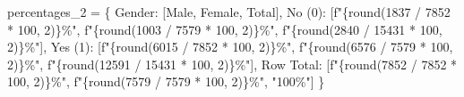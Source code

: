 \documentclass[
  letterpaper,
  DIV=11,
  numbers=noendperiod]{scrreprt}
\newenvironment{Shaded}{\begin{snugshade}}{\end{snugshade}}
\newcommand{\BuiltInTok}[1]{\textcolor[rgb]{0.00,0.23,0.31}{#1}}
\newcommand{\DecValTok}[1]{\textcolor[rgb]{0.68,0.00,0.00}{#1}}
\newcommand{\NormalTok}[1]{\textcolor[rgb]{0.00,0.23,0.31}{#1}}
\newcommand{\OperatorTok}[1]{\textcolor[rgb]{0.37,0.37,0.37}{#1}}
\newcommand{\SpecialCharTok}[1]{\textcolor[rgb]{0.37,0.37,0.37}{#1}}
\newcommand{\SpecialStringTok}[1]{\textcolor[rgb]{0.13,0.47,0.30}{#1}}
\newcommand{\StringTok}[1]{\textcolor[rgb]{0.13,0.47,0.30}{#1}}
\begin{document}
\begin{tcolorbox}
\begin{Shaded}
\begin{Highlighting}[]
\NormalTok{percentages\_2 }\OperatorTok{=}\NormalTok{ \{}
    \StringTok{\textquotesingle{}Gender\textquotesingle{}}\NormalTok{: [}\StringTok{\textquotesingle{}Male\textquotesingle{}}\NormalTok{, }\StringTok{\textquotesingle{}Female\textquotesingle{}}\NormalTok{, }\StringTok{\textquotesingle{}Total\textquotesingle{}}\NormalTok{],}
    \StringTok{\textquotesingle{}No (0)\textquotesingle{}}\NormalTok{: [}\SpecialStringTok{f"}\SpecialCharTok{\{}\BuiltInTok{round}\NormalTok{(}\DecValTok{1837} \OperatorTok{/} \DecValTok{7852} \OperatorTok{*} \DecValTok{100}\NormalTok{, }\DecValTok{2}\NormalTok{)}\SpecialCharTok{\}}\SpecialStringTok{\%"}\NormalTok{, }\SpecialStringTok{f"}\SpecialCharTok{\{}\BuiltInTok{round}\NormalTok{(}\DecValTok{1003} \OperatorTok{/} \DecValTok{7579} \OperatorTok{*} \DecValTok{100}\NormalTok{, }\DecValTok{2}\NormalTok{)}\SpecialCharTok{\}}\SpecialStringTok{\%"}\NormalTok{, }\SpecialStringTok{f"}\SpecialCharTok{\{}\BuiltInTok{round}\NormalTok{(}\DecValTok{2840} \OperatorTok{/} \DecValTok{15431} \OperatorTok{*} \DecValTok{100}\NormalTok{, }\DecValTok{2}\NormalTok{)}\SpecialCharTok{\}}\SpecialStringTok{\%"}\NormalTok{],}
    \StringTok{\textquotesingle{}Yes (1)\textquotesingle{}}\NormalTok{: [}\SpecialStringTok{f"}\SpecialCharTok{\{}\BuiltInTok{round}\NormalTok{(}\DecValTok{6015} \OperatorTok{/} \DecValTok{7852} \OperatorTok{*} \DecValTok{100}\NormalTok{, }\DecValTok{2}\NormalTok{)}\SpecialCharTok{\}}\SpecialStringTok{\%"}\NormalTok{, }\SpecialStringTok{f"}\SpecialCharTok{\{}\BuiltInTok{round}\NormalTok{(}\DecValTok{6576} \OperatorTok{/} \DecValTok{7579} \OperatorTok{*} \DecValTok{100}\NormalTok{, }\DecValTok{2}\NormalTok{)}\SpecialCharTok{\}}\SpecialStringTok{\%"}\NormalTok{, }\SpecialStringTok{f"}\SpecialCharTok{\{}\BuiltInTok{round}\NormalTok{(}\DecValTok{12591} \OperatorTok{/} \DecValTok{15431} \OperatorTok{*} \DecValTok{100}\NormalTok{, }\DecValTok{2}\NormalTok{)}\SpecialCharTok{\}}\SpecialStringTok{\%"}\NormalTok{],}
    \StringTok{\textquotesingle{}Row Total\textquotesingle{}}\NormalTok{: [}\SpecialStringTok{f"}\SpecialCharTok{\{}\BuiltInTok{round}\NormalTok{(}\DecValTok{7852} \OperatorTok{/} \DecValTok{7852} \OperatorTok{*} \DecValTok{100}\NormalTok{, }\DecValTok{2}\NormalTok{)}\SpecialCharTok{\}}\SpecialStringTok{\%"}\NormalTok{, }\SpecialStringTok{f"}\SpecialCharTok{\{}\BuiltInTok{round}\NormalTok{(}\DecValTok{7579} \OperatorTok{/} \DecValTok{7579} \OperatorTok{*} \DecValTok{100}\NormalTok{, }\DecValTok{2}\NormalTok{)}\SpecialCharTok{\}}\SpecialStringTok{\%"}\NormalTok{, }\StringTok{"100\%"}\NormalTok{]}
\NormalTok{\}}



\end{Highlighting}
\end{Shaded}
\end{tcolorbox}
\end{document}
